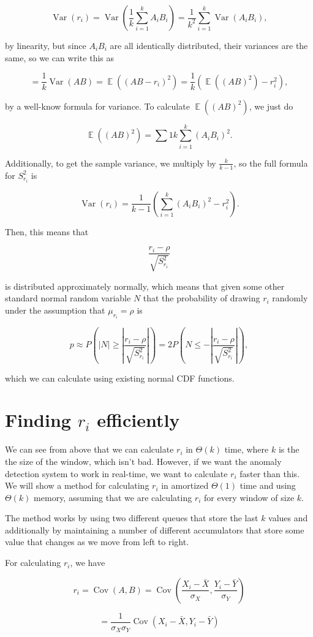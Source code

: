 \documentclass{article}
\DeclareMathOperator{\E}{\mathbb{E}}
\DeclareMathOperator{\Cov}{\mathrm{Cov}}
\DeclareMathOperator{\Var}{\mathrm{Var}}
\begin{document}
$$\Var(r_i) = \Var(\frac{1}{k} \sum_{i = 1}^k A_i B_i) = \frac{1}{k^2} \sum_{i =1}^k \Var(A_i B_i),$$

by linearity, but since $A_i B_i$ are all identically distributed, their variances are the same, so we can write this as

$$ = \frac{1}{k} \Var(AB) = \E((AB - r_i)^2) = \frac{1}{k}\left(\E((AB)^2) - r_i^2\right),$$

by a well-know formula for variance. To calculate $\E((AB)^2)$, we just do

$$\E((AB)^2) = \sum{1}{k} \sum_{i=1}^k (A_i B_i)^2.$$

Additionally, to get the sample variance, we multiply by $\frac{k}{k-1}$, so the full formula for $S^2_{r_i}$ is

$$\Var(r_i) = \frac{1}{k-1}\left(\sum_{i=1}^k (A_i B_i)^2 - r_i^2\right).$$

Then, this means that

$$\frac{r_i - \rho}{\sqrt{S^2_{r_i}}}$$

is distributed approximately normally, which means that given some other standard normal random variable $N$ that the probability of drawing $r_i$ randomly under the assumption that $\mu_{r_i} = \rho$ is

$$p \approx P\left(|N| \ge \left|\frac{r_i - \rho}{\sqrt{S^2_{r_i}}}\right|\right)
= 2P\left(N \le -\left|\frac{r_i - \rho}{\sqrt{S^2_{r_i}}}\right|\right),$$

which we can calculate using existing normal CDF functions.

\section{Finding $r_i$ efficiently}

We can see from above that we can calculate $r_i$ in $\Theta(k)$ time, where $k$ is the the size of the window, which isn't bad. However, if we want the anomaly detection system to work in real-time, we want to calculate $r_i$ faster than this. We will show a method for calculating $r_i$ in amortized $\Theta(1)$ time and using $\Theta(k)$ memory, assuming that we are calculating $r_i$ for every window of size $k$.

The method works by using two different queues that store the last $k$ values and additionally by maintaining a number of different accumulators that store some value that changes as we move from left to right.

For calculating $r_i$, we have

$$r_i = \Cov(A, B) = \Cov \left( \frac{X_i - \bar X}{\sigma_X}, \frac{Y_i - \bar Y}{\sigma_Y}\right)$$

$$= \frac{1}{\sigma_X \sigma_Y} \Cov(X_i - \bar X, Y_i - \bar Y)$$




\end{document}
